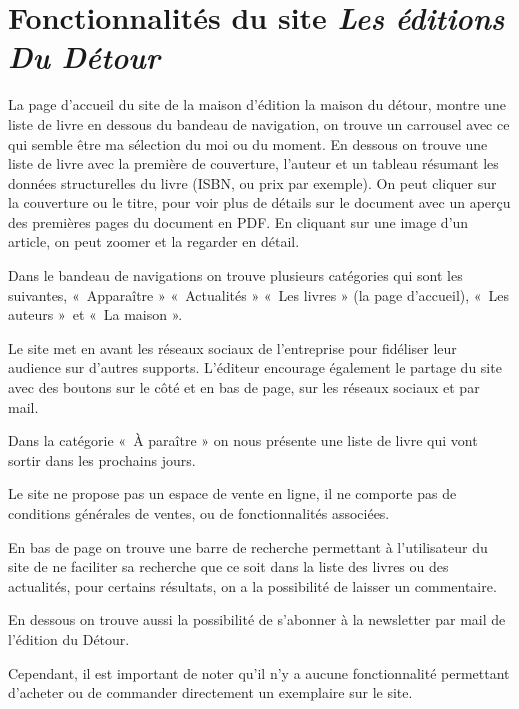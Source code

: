 \documentclass[a4paper, 13pt]{article}
\begin{document}
\section{Fonctionnalités du site \textit{Les éditions Du Détour}}

La page d’accueil du site de la maison d’édition la maison du détour, montre une liste de livre en dessous du bandeau de navigation, on trouve un carrousel avec ce qui semble être ma sélection du moi ou du moment. En dessous on trouve une liste de livre avec la première de couverture, l’auteur et un tableau résumant les données structurelles du livre (ISBN, ou prix par exemple). On peut cliquer sur la couverture ou le titre, pour voir plus de détails sur le document avec un aperçu des premières pages du document en PDF. En cliquant sur une image d’un article, on peut zoomer et la regarder en détail.

Dans le bandeau de navigations on trouve plusieurs catégories qui sont les suivantes, « Apparaître » « Actualités » « Les livres » (la page d’accueil), « Les auteurs » et « La maison ».

Le site met en avant les réseaux sociaux de l’entreprise pour fidéliser leur audience sur d’autres supports. L’éditeur encourage également le partage du site avec des boutons sur le côté et en bas de page, sur les réseaux sociaux et par mail.

Dans la catégorie « À paraître » on nous présente une liste de livre qui vont sortir dans les prochains jours.

Le site ne propose pas un espace de vente en ligne, il ne comporte pas de conditions générales de ventes, ou de fonctionnalités associées.

En bas de page on trouve une barre de recherche permettant à l’utilisateur du site de ne faciliter sa recherche que ce soit dans la liste des livres ou des actualités, pour certains résultats, on a la possibilité de laisser un commentaire. 

En dessous on trouve aussi la possibilité de s’abonner à la newsletter par mail de l’édition du Détour.

Cependant, il est important de noter qu’il n’y a aucune fonctionnalité permettant d’acheter ou de commander directement un exemplaire sur le site.
\end{document}
